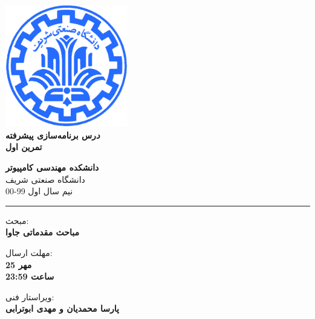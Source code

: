 \documentclass[]{article}
\begin{document}
\begin{titlepage}
\begin{center}
        
\vspace*{0.7cm}

\includegraphics[width=0.4\textwidth]{sharif1.png}\\
\vspace{0.5cm}
\textbf{ \Huge{\emph درس برنامه‌سازی پیشرفته} }\\
\vspace{0.5cm}
\textbf{ \Large{ تمرین اول} }
\vspace{0.2cm}
       
 
      \large \textbf{دانشکده مهندسی کامپیوتر}\\\vspace{0.2cm}
    \large   دانشگاه صنعتی شریف\\\vspace{0.2cm}
       \large  نیم سال اول 99-00 \\\vspace{0.2cm}
      \noindent\rule[1ex]{\linewidth}{1pt}
    مبحث:\\
    \textbf{{مباحث مقدماتی جاوا}}

    \vspace{0.20cm}

   مهلت ارسال:\\
    \textbf{{25 مهر}}\\
    \textbf{{ساعت 23:59}}

    \vspace{0.15cm}
ویراستار فنی:\\
    \textbf{{پارسا محمدیان و مهدی ابوترابی}}
\end{center}
\end{titlepage}


\newpage
\pagestyle{fancy}
\fancyhf{}
\fancyfoot{}
\cfoot{\thepage}
\end{document}
